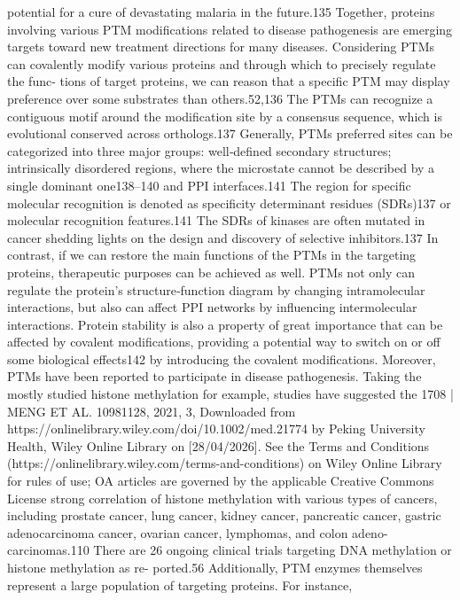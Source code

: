 potential for a cure of devastating malaria in the future.135 Together, proteins involving various PTM modifications
related to disease pathogenesis are emerging targets toward new treatment directions for many diseases.
Considering PTMs can covalently modify various proteins and through which to precisely regulate the func-
tions of target proteins, we can reason that a specific PTM may display preference over some substrates than
others.52,136 The PTMs can recognize a contiguous motif around the modification site by a consensus sequence,
which is evolutional conserved across orthologs.137 Generally, PTMs preferred sites can be categorized into three
major groups: well‐defined secondary structures; intrinsically disordered regions, where the microstate cannot be
described by a single dominant one138–140 and PPI interfaces.141 The region for specific molecular recognition is
denoted as specificity determinant residues (SDRs)137 or molecular recognition features.141 The SDRs of kinases
are often mutated in cancer shedding lights on the design and discovery of selective inhibitors.137 In contrast, if we
can restore the main functions of the PTMs in the targeting proteins, therapeutic purposes can be achieved as well.
PTMs not only can regulate the protein's structure‐function diagram by changing intramolecular interactions,
but also can affect PPI networks by influencing intermolecular interactions. Protein stability is also a property of
great importance that can be affected by covalent modifications, providing a potential way to switch on or off some
biological effects142 by introducing the covalent modifications. Moreover, PTMs have been reported to participate
in disease pathogenesis. Taking the mostly studied histone methylation for example, studies have suggested the
1708 |
MENG ET AL.
 10981128, 2021, 3, Downloaded from https://onlinelibrary.wiley.com/doi/10.1002/med.21774 by Peking University Health, Wiley Online Library on [28/04/2026]. See the Terms and Conditions (https://onlinelibrary.wiley.com/terms-and-conditions) on Wiley Online Library for rules of use; OA articles are governed by the applicable Creative Commons License
strong correlation of histone methylation with various types of cancers, including prostate cancer, lung cancer,
kidney cancer, pancreatic cancer, gastric adenocarcinoma cancer, ovarian cancer, lymphomas, and colon adeno-
carcinomas.110 There are 26 ongoing clinical trials targeting DNA methylation or histone methylation as re-
ported.56 Additionally, PTM enzymes themselves represent a large population of targeting proteins. For instance,
